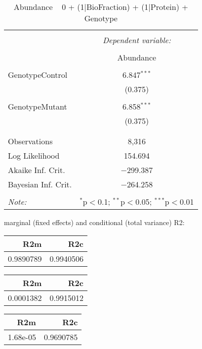 \documentclass[11pt]{report}
\begin{document}
\begin{table}[!htbp] \centering 
  \caption{Abundance ~ 0 + (1|BioFraction) + (1|Protein) + Genotype} 
  \label{} 
\begin{tabular}{@{\extracolsep{5pt}}lc} 
\\[-1.8ex]\hline 
\hline \\[-1.8ex] 
 & \multicolumn{1}{c}{\textit{Dependent variable:}} \\ 
\cline{2-2} 
\\[-1.8ex] & Abundance \\ 
\hline \\[-1.8ex] 
 GenotypeControl & 6.847$^{***}$ \\ 
  & (0.375) \\ 
  & \\ 
 GenotypeMutant & 6.858$^{***}$ \\ 
  & (0.375) \\ 
  & \\ 
\hline \\[-1.8ex] 
Observations & 8,316 \\ 
Log Likelihood & 154.694 \\ 
Akaike Inf. Crit. & $-$299.387 \\ 
Bayesian Inf. Crit. & $-$264.258 \\ 
\hline 
\hline \\[-1.8ex] 
\textit{Note:}  & \multicolumn{1}{r}{$^{*}$p$<$0.1; $^{**}$p$<$0.05; $^{***}$p$<$0.01} \\ 
\end{tabular} 
\end{table} 
marginal (fixed effects) and conditional (total variance) R2:

\begin{tabular}{r|r}
\hline
R2m & R2c\\
\hline
0.9890789 & 0.9940506\\
\hline
\end{tabular}

\begin{tabular}{r|r}
\hline
R2m & R2c\\
\hline
0.0001382 & 0.9915012\\
\hline
\end{tabular}

\begin{tabular}{r|r}
\hline
R2m & R2c\\
\hline
1.68e-05 & 0.9690785\\
\hline
\end{tabular}
\end{document}
